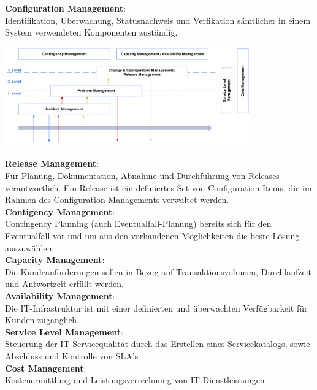 \documentclass{report}
\newenvironment{Figure}
	{\par\medskip\noindent\minipage{\linewidth}}
	{\endminipage\par\medskip}
\theoremstyle{definition}
\theoremstyle{example}
\begin{document}
\textbf{Configuration Management}:\\
Identifikation, Überwachung, Statusnachweis und Verfikation sämtlicher in einem System verwendeten Komponenten zuständig.\\

\begin{Figure}
\centering
\includegraphics[width=400px]{img/itilLevelUebersicht.png}
	\label{fig:ITIL Level}
\end{Figure}

\textbf{Release Management}:\\
Für Planung, Dokumentation, Abnahme und Durchführung von Releases verantwortlich. Ein Release ist ein definiertes Set von Configuration Items, die im Rahmen des Configuration Managements verwaltet werden.\\

\textbf{Contigency Management}:\\
Contingency Planning (auch Eventualfall-Planung) bereits sich für den Eventualfall vor und um aus den vorhandenen Möglichkeiten die beste Lösung auszuwählen.\\

\textbf{Capacity Management}:\\
Die Kundeanforderungen sollen in Bezug auf Transaktionsvolumen, Durchlaufzeit und Antwortzeit erfüllt werden.\\

\textbf{Availability Management}:\\
Die IT-Infrastruktur ist mit einer definierten und überwachten Verfügbarkeit für Kunden zugänglich.\\

\textbf{Service Level Management}:\\
Steuerung der IT-Servicequalität durch das Erstellen eines Servicekatalogs, sowie Abschluss und Kontrolle von SLA's\\

\textbf{Cost Management}:\\
Kostenermittlung und Leistungsverrechnung von IT-Dienstleistungen
\end{document}
